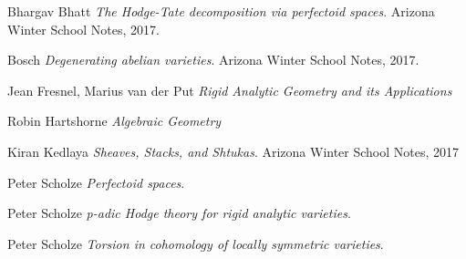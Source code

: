 \documentclass[11pt,oneside]{amsart}
\theoremstyle{theorem}
\theoremstyle{definition}
\theoremstyle{remark}
\begin{document}
\begin{thebibliography}{9}

Bhargav Bhatt
\textit{The Hodge-Tate decomposition via perfectoid spaces}. 
Arizona Winter School Notes, 2017.

Bosch
\textit{Degenerating abelian varieties}. 
Arizona Winter School Notes, 2017.

Jean Fresnel, Marius van der Put
\textit{Rigid Analytic Geometry and its Applications}

Robin Hartshorne
\textit{Algebraic Geometry}

Kiran Kedlaya
\textit{Sheaves, Stacks, and Shtukas}.
Arizona Winter School Notes, 2017

Peter Scholze
\textit{Perfectoid spaces}. 


Peter Scholze
\textit{p-adic Hodge theory for rigid analytic varieties}. 

Peter Scholze
\textit{Torsion in cohomology of locally symmetric varieties}.




\end{thebibliography}


 
\end{document}
